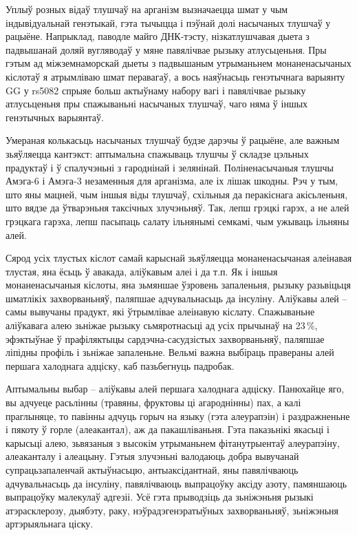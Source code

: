 Уплыў розных відаў тлушчаў на арганізм вызначаецца шмат у чым індывідуальнай генэтыкай, гэта тычыцца і пэўнай долі насычаных тлушчаў у рацыёне. Напрыклад, паводле майго ДНК-тэсту, нізкатлушчавая дыета з падвышанай доляй вугляводаў у мяне павялічвае рызыку атлусьценьня. Пры гэтым ад міжземнаморскай дыеты з падвышаным утрыманьнем монаненасычаных кіслотаў я атрымліваю шмат перавагаў, а вось наяўнасьць генэтычнага варыянту GG у rs5082 спрыяе больш актыўнаму набору вагі і павялічвае рызыку атлусьценьня пры спажываньні насычаных тлушчаў, чаго няма ў іншых генэтычных варыянтаў.

Умераная колькасьць насычаных тлушчаў будзе дарэчы ў рацыёне, але важным зьяўляецца кантэкст: аптымальна спажываць тлушчы ў складзе цэльных прадуктаў і ў спалучэньні з гароднінай і зелянінай. Поліненасычаныя тлушчы Амэга-6 і Амэга-3 незаменныя для арганізма, але іх лішак шкодны. Рэч у тым, што яны мацней, чым іншыя віды тлушчаў, схільныя да перакіснага акісьленьня, што вядзе да ўтварэньня таксічных злучэньняў. Так, лепш грэцкі гарэх, а не алей грэцкага гарэха, лепш пасыпаць салату ільнянымі семкамі, чым ужываць ільняны алей.

Сярод усіх тлустых кіслот самай карыснай зьяўляецца монаненасычаная алеінавая тлустая, яна ёсьць ў авакада, аліўкавым алеі і да т.п. Як і іншыя монаненасычаныя кіслоты, яна зьмяншае ўзровень запаленьня, рызыку разьвіцьця шматлікіх захворваньняў, паляпшае адчувальнасьць да інсуліну. Аліўкавы алей – самы вывучаны прадукт, які ўтрымлівае алеінавую кіслату. Спажываньне аліўкавага алею зьніжае рызыку сьмяротнасьці ад усіх прычынаў на 23\,\%, эфэктыўнае ў прафіляктыцы сардэчна-сасудзістых захворваньняў, паляпшае ліпідны профіль і зьніжае запаленьне. Вельмі важна выбіраць правераны алей першага халоднага адціску, каб пазьбегнуць падробак.

Аптымальны выбар – аліўкавы алей першага халоднага адціску. Панюхайце яго, вы адчуеце расьлінны (травяны, фруктовы ці агароднінны) пах, а калі праглыняце, то павінны адчуць горыч на языку (гэта алеурапэін) і раздражненьне і пякоту ў горле (алеакантал), аж да пакашліваньня. Гэта паказьнікі якасьці і карысьці алею, зьвязаныя з высокім утрыманьнем фітанутрыентаў алеурапэіну, алеаканталу і алеацыну. Гэтыя злучэньні валодаюць добра вывучанай супрацьзапаленчай актыўнасьцю, антыаксідантнай, яны павялічваюць адчувальнасьць да інсуліну, павялічваюць выпрацоўку аксіду азоту, памяншаюць выпрацоўку малекулаў адгезіі. Усё гэта прыводзіць да зьніжэньня рызыкі атэрасклерозу, дыябэту, раку, нэўрадэгенэратыўных захворваньняў, зьніжэньня артэрыяльнага ціску.

